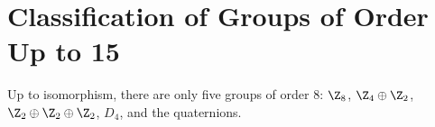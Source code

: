 \section{Classification of Groups of Order Up to 15}

\begin{theorem}
	Up to isomorphism, there are only five groups of order 8: $\Z_8$, $\Z_4 \oplus \Z_2$, $\Z_2 \oplus \Z_2 \oplus \Z_2$, $D_4$, and the quaternions.
\end{theorem}
